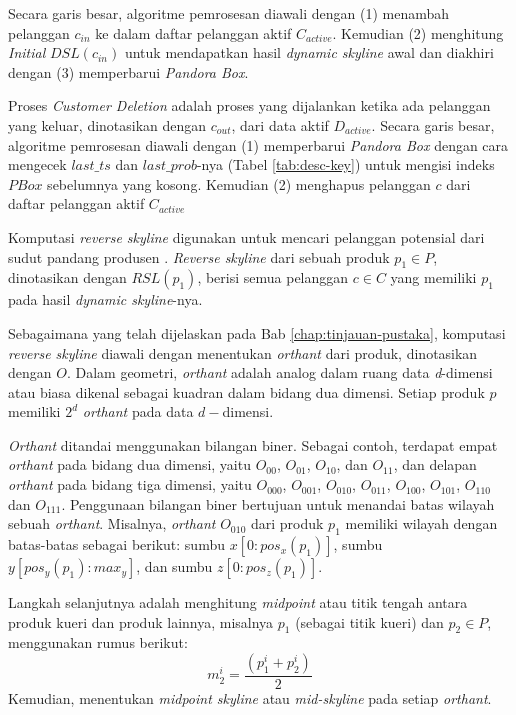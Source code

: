 Secara garis besar, algoritme pemrosesan diawali dengan (1) menambah pelanggan $c_{in}$ ke dalam daftar pelanggan aktif $C_{active}$. Kemudian (2) menghitung \textit{Initial} $DSL(c_{in})$ untuk mendapatkan hasil \textit{dynamic skyline} awal dan diakhiri dengan (3) memperbarui \textit{Pandora Box}.


Proses \textit{Customer Deletion} adalah proses yang dijalankan ketika ada pelanggan yang keluar, dinotasikan dengan $c_{out}$, dari data aktif $D_{active}$. Secara garis besar, algoritme pemrosesan diawali dengan (1) memperbarui \textit{Pandora Box} dengan cara mengecek $last\_ts$ dan $last\_prob$-nya (Tabel \ref{tab:desc-key}) untuk mengisi indeks $PBox$ sebelumnya yang kosong. Kemudian (2) menghapus pelanggan $c$ dari daftar pelanggan aktif $C_{active}$


Komputasi \textit{reverse skyline} digunakan untuk mencari pelanggan potensial dari sudut pandang produsen \cite{kmpp}. \textit{Reverse skyline} \cite{reverse-skyline} dari sebuah produk $p_1 \in
P$, dinotasikan dengan $RSL(p_1)$, berisi semua pelanggan $c \in C$ yang memiliki $p_1$ pada hasil \textit{dynamic skyline}-nya.

Sebagaimana yang telah dijelaskan pada Bab \ref{chap:tinjauan-pustaka}, komputasi \textit{reverse skyline} diawali dengan menentukan \textit{orthant} dari produk, dinotasikan dengan $O$. Dalam geometri, \textit{orthant} adalah analog dalam ruang data \textit{d}-dimensi atau biasa dikenal sebagai kuadran dalam bidang dua dimensi. Setiap produk $p$ memiliki $2^d$ \textit{orthant} pada data $d-$dimensi. 

\textit{Orthant} ditandai menggunakan bilangan biner. Sebagai contoh, terdapat empat \textit{orthant} pada bidang dua dimensi, yaitu $O_{00}$, $O_{01}$, $O_{10}$, dan $O_{11}$, dan delapan \textit{orthant} pada bidang tiga dimensi, yaitu $O_{000}$, $O_{001}$, $O_{010}$, $O_{011}$, $O_{100}$, $O_{101}$, $O_{110}$ dan $O_{111}$. Penggunaan bilangan biner bertujuan untuk menandai batas wilayah sebuah \textit{orthant}. Misalnya, \textit{orthant} $O_{010}$ dari produk $p_1$ memiliki wilayah dengan batas-batas sebagai berikut: sumbu $x [0:pos_x(p_1)]$, sumbu $y [pos_y(p_1):max_y]$, dan sumbu $z [0:pos_z(p_1)]$.

Langkah selanjutnya adalah menghitung \textit{midpoint} atau titik tengah antara produk kueri dan produk lainnya, misalnya $p_1$ (sebagai titik kueri) dan $p_2 \in P$, menggunakan rumus berikut: 
\begin{equation} \label{eq:midpoint2}
m_2^i = \frac{(p_1^i + p_2^i)}{2}
\end{equation}
Kemudian, menentukan \textit{midpoint skyline} atau \textit{mid-skyline} \cite{mid-skyline} pada setiap \textit{orthant}.

